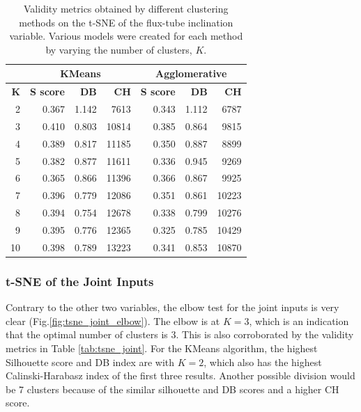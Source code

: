 \begin{table}[h]
    \caption[Validity metrics for t-SNE of the Flux-tube Inclination]{Validity metrics obtained by different clustering methods on the t-SNE of the flux-tube inclination variable. Various models were created for each method by varying the number of clusters, $K$.}\label{tab:tsne_a}
    \begin{tabular}{@{}rrrr|rrr@{}}
    \cmidrule(l){2-7}
    \multicolumn{1}{l}{}            & \multicolumn{3}{c|}{\textbf{KMeans}}         & \multicolumn{3}{c}{\textbf{Agglomerative}}   \\ \midrule
    \multicolumn{1}{r|}{\textbf{K}} & \textbf{S score} & \textbf{DB} & \textbf{CH} & \textbf{S score} & \textbf{DB} & \textbf{CH} \\ \midrule
    \multicolumn{1}{r|}{2}          & 0.367            & 1.142       & 7613    & 0.343            & 1.112       & 6787    \\
    \multicolumn{1}{r|}{3}          & 0.410            & 0.803       & 10814   & 0.385            & 0.864       & 9815    \\
    \multicolumn{1}{r|}{4}          & 0.389            & 0.817       & 11185   & 0.350            & 0.887       & 8899    \\
    \multicolumn{1}{r|}{5}          & 0.382            & 0.877       & 11611   & 0.336            & 0.945       & 9269    \\
    \multicolumn{1}{r|}{6}          & 0.365            & 0.866       & 11396   & 0.366            & 0.867       & 9925    \\
    \multicolumn{1}{r|}{7}          & 0.396            & 0.779       & 12086   & 0.351            & 0.861       & 10223   \\
    \multicolumn{1}{r|}{8}          & 0.394            & 0.754       & 12678   & 0.338            & 0.799       & 10276   \\
    \multicolumn{1}{r|}{9}          & 0.395            & 0.776       & 12365   & 0.325            & 0.785       & 10429   \\
    \multicolumn{1}{r|}{10}         & 0.398            & 0.789       & 13223   & 0.341            & 0.853       & 10870   \\ \bottomrule
    \end{tabular}
    \end{table}

\subsubsection{t-SNE of the Joint Inputs}\label{sec:tsne_joint}
Contrary to the other two variables, the elbow test for the joint inputs is very clear (Fig.\ref{fig:tsne_joint_elbow}). The elbow is at $K=3$, which is an indication that the optimal number of clusters is 3. This is also corroborated by the validity metrics in Table \ref{tab:tsne_joint}. For the KMeans algorithm, the highest Silhouette score and DB index are with $K=2$, which also has the highest Calinski-Harabasz index of the first three results. Another possible division would be 7 clusters because of the similar silhouette and DB scores and a higher CH score. 

